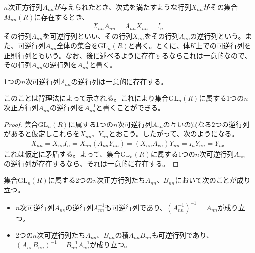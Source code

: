 \documentclass[dvipdfmx]{jsarticle}
\begin{document}
\begin{dfn}
$n$次正方行列$A_{nn}$が与えられたとき、次式を満たすような行列$X_{nn}$がその集合$M_{nn}(R)$に存在するとき、
\begin{align*}
X_{nn}A_{nn} = A_{nn}X_{nn} = I_{n}
\end{align*}
その行列$A_{nn}$を可逆行列といい、その行列$X_{nn}$をその行列$A_{nn}$の逆行列という。また、可逆行列$A_{nn}$全体の集合を${\mathrm{GL}}_{n}(R)$と書く。とくに、体$K$上での可逆行列を正則行列ともいう。なお、後に述べるように存在するならこれは一意的なので、その行列$A_{nn}$の逆行列を$A_{nn}^{- 1}$と書く。
\end{dfn}
\begin{thm}\label{2.1.3.5}
1つの$n$次可逆行列$A_{nn}$の逆行列は一意的に存在する。
\end{thm}\par
このことは背理法によって示される。これにより集合${\mathrm{GL}}_{n}(R)$に属する1つの$n$次正方行列$A_{nn}$の逆行列を$A_{nn}^{- 1}$と書くことができる。
\begin{proof}
集合${\mathrm{GL}}_{n}(R)$に属する1つの$n$次可逆行列$A_{nn}$の互いの異なる2つの逆行列があると仮定しこれらを$X_{nn}$、$Y_{nn}$とおこう。したがって、次のようになる。
\begin{align*}
X_{nn} = X_{nn}I_{n} = X_{nn}\left( A_{nn}Y_{nn} \right) = \left( X_{nn}A_{nn} \right)Y_{nn} = I_{n}Y_{nn} = Y_{nn}
\end{align*}
これは仮定に矛盾する。よって、集合${\mathrm{GL}}_{n}(R)$に属する1つの$n$次可逆行列$A_{nn}$の逆行列が存在するなら、それは一意的に存在する。
\end{proof}
\begin{thm}\label{2.1.3.6}
集合${\mathrm{GL}}_{n}(R)$に属する2つの$n$次正方行列たち$A_{nn}$、$B_{nn}$において次のことが成り立つ。
\begin{itemize}
\item
  $n$次可逆行列$A_{nn}$の逆行列$A_{nn}^{- 1}$も可逆行列であり、$\left( A_{nn}^{- 1} \right)^{- 1} = A_{nn}$が成り立つ。
\item
  2つの$n$次可逆行列たち$A_{nn}$、$B_{nn}$の積$A_{nn}B_{nn}$も可逆行列であり、$\left( A_{nn}B_{nn} \right)^{- 1} = B_{nn}^{- 1}A_{nn}^{- 1}$が成り立つ。
\end{itemize}
\end{thm}
\end{document}
